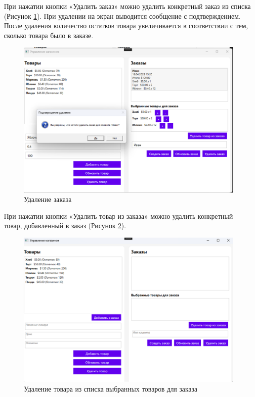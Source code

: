 \documentclass[12pt]{article}
\begin{document}
\pagebreak

При нажатии кнопки «Удалить заказ» можно удалить конкретный заказ из списка (Рисунок \ref{fig:demo9}). При удалении на экран выводится сообщение с подтверждением. После удаления количество остатков товара увеличивается в соответствии с тем, сколько товара было в заказе.

\begin{figure}[ht]
	\centering
	\includegraphics[width=1.0\textwidth]{fig/image 66.png}
	\caption{Удаление заказа} %
	\label{fig:demo9}
\end{figure}

\pagebreak


При нажатии кнопки «Удалить товар из заказа» можно удалить конкретный товар, добавленный в заказ (Рисунок \ref{fig:demo10}).


\begin{figure}[ht]
	\centering
	\includegraphics[width=1.0\textwidth]{fig/image 67.png}
	\caption{Удаление товара из списка выбранных товаров для заказа} %
	\label{fig:demo10}
\end{figure}
\end{document}
